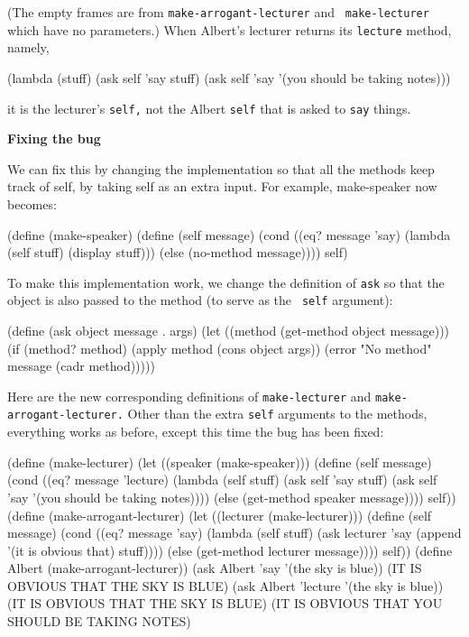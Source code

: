 \vskip 2in

(The empty frames are from {\tt make-arrogant-lecturer} and {\tt
make-lecturer} which have no parameters.)  When Albert's lecturer
returns its {\tt lecture} method, namely,

\beginlisp
(lambda (stuff)
  (ask self 'say stuff)
  (ask self 'say '(you should be taking notes)))
\endlisp

it is the lecturer's {\tt self,} not the Albert {\tt self} that is asked to
{\tt say} things.

{\bf Fixing the bug}

We can fix this by changing the implementation so that all the methods
keep track of self, by taking self as an extra input.  For example,
make-speaker now becomes:

\beginlisp
(define (make-speaker)
  (define (self message)
    (cond ((eq? message 'say)
           (lambda (self stuff) (display stuff)))
          (else (no-method message))))
  self)
\endlisp

To make this implementation work, we change the definition of  {\tt ask}
so that the object is also passed to the method (to serve as the {\tt
self} argument):

\beginlisp
(define (ask object message . args)
  (let ((method (get-method object message)))
    (if (method? method)
         (apply method (cons object args))
         (error "No method" message (cadr method)))))
\endlisp

Here are the new corresponding definitions of {\tt make-lecturer} and
{\tt make-arrogant-lecturer.}  Other than the extra {\tt self} arguments
to the
methods, everything works as before, except this time the bug has been
fixed:

\beginlisp
(define (make-lecturer)
  (let ((speaker (make-speaker)))
    (define (self message)
      (cond ((eq? message 'lecture)
             (lambda (self stuff)
               (ask self 'say stuff)
               (ask self 'say '(you should be taking notes))))
            (else (get-method speaker message))))
    self))
\null
(define (make-arrogant-lecturer)
  (let ((lecturer (make-lecturer)))
    (define (self message)
      (cond ((eq? message 'say)
             (lambda (self stuff)
               (ask lecturer 'say (append '(it is obvious that) stuff))))
            (else (get-method lecturer message))))
    self))
\null
(define Albert (make-arrogant-lecturer))
\null
(ask Albert 'say '(the sky is blue))
(IT IS OBVIOUS THAT THE SKY IS BLUE)
\null
(ask Albert 'lecture '(the sky is blue))
(IT IS OBVIOUS THAT THE SKY IS BLUE)
(IT IS OBVIOUS THAT YOU SHOULD BE TAKING NOTES)
\null
\endlisp

